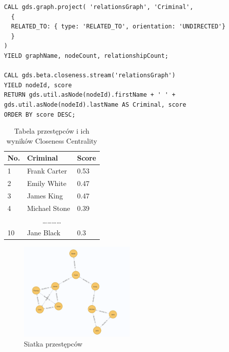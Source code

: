 \documentclass[a4paper,12pt]{article}
\begin{document}
\begin{verbatim}
CALL gds.graph.project( 'relationsGraph', 'Criminal',
  { 
  RELATED_TO: { type: 'RELATED_TO', orientation: 'UNDIRECTED'} 
  }
)
YIELD graphName, nodeCount, relationshipCount;

CALL gds.beta.closeness.stream('relationsGraph') 
YIELD nodeId, score 
RETURN gds.util.asNode(nodeId).firstName + ' ' + gds.util.asNode(nodeId).lastName AS Criminal, score 
ORDER BY score DESC;

\end{verbatim}

\begin{table}[h!] \centering \begin{tabular}{|l|l|l|} 
\hline 
\textbf{No.} & \textbf{Criminal} & \textbf{Score} \\ \hline 
1 & Frank Carter & 0.53 \\ \hline 
2 & Emily White & 0.47 \\ \hline 
3 & James King & 0.47 \\ \hline 
4 & Michael Stone & 0.39 \\ \hline 
\multicolumn{3}{|c|}{\dots\dots\dots\dots} \\ \hline
10 & Jane Black & 0.3 \\ \hline 
\end{tabular} \caption{Tabela przestępców i ich wyników Closeness Centrality} \end{table}

\begin{figure}[h!]
    \centering
    \includegraphics[width=0.5\textwidth]{relations.png} 
    \caption{Siatka przestępców}
\end{figure}
\end{document}
